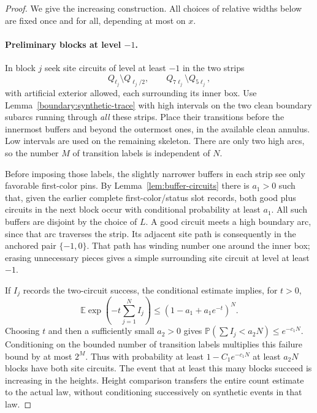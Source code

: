 \documentclass[11pt]{article}
\newcommand{\E}{\mathbb E}
\newcommand{\Prob}{\mathbb P}
\theoremstyle{definition}
\theoremstyle{remark}
\numberwithin{equation}{section}
\begin{document}
\begin{proof}
We give the increasing construction.  All choices of relative widths
below are fixed once and for all, depending at most on $x$.

\paragraph{Preliminary blocks at level $-1$.}
In block $j$ seek site circuits of level at least $-1$ in the two
strips
\[
 Q_{\ell_j}\setminus Q_{\ell_j/2},
 \qquad Q_{7\ell_j}\setminus Q_{5\ell_j},
\]
with artificial exterior allowed, each surrounding its inner box.
Use Lemma~\ref{boundary:synthetic-trace} with high intervals on the
two clean boundary subarcs running through \emph{all} these strips.
Place their transitions before the innermost buffers and beyond
the outermost ones, in the available clean annulus.  Low intervals
are used on the remaining skeleton.  There are only two high arcs,
so the number $M$ of transition labels is independent of $N$.

Before imposing those labels, the slightly narrower buffers in
each strip see only favorable first-color pins.  By
Lemma~\ref{lem:buffer-circuits} there is $a_1>0$ such that, given
the earlier complete first-color/status slot records, both good
plus circuits in the next block occur with conditional probability
at least $a_1$.  All such buffers are disjoint by the choice of $L$.
A good circuit meets a high boundary arc, since that arc traverses
the strip.  Its adjacent site path is consequently in the anchored
pair $\{-1,0\}$.  That path has winding number one around the inner
box; erasing unnecessary pieces gives a simple surrounding site
circuit at level at least $-1$.

If $I_j$ records the two-circuit success, the conditional estimate
implies, for $t>0$,
\[
 \E\exp\!\left(-t\sum_{j=1}^N I_j\right)
 \le(1-a_1+a_1e^{-t})^N.
\]
Choosing $t$ and then a sufficiently small $a_2>0$ gives
$\Prob(\sum I_j<a_2N)\le e^{-c_1N}$.
Conditioning on the bounded number of transition labels multiplies
this failure bound by at most $2^M$.  Thus with probability at least
$1-C_1e^{-c_1N}$ at least $a_2N$ blocks have both site circuits.
The event that at least this many blocks succeed is increasing in
the heights.  Height comparison transfers the entire count estimate
to the actual law, without conditioning successively on synthetic
events in that law.


\end{proof}
\end{document}
